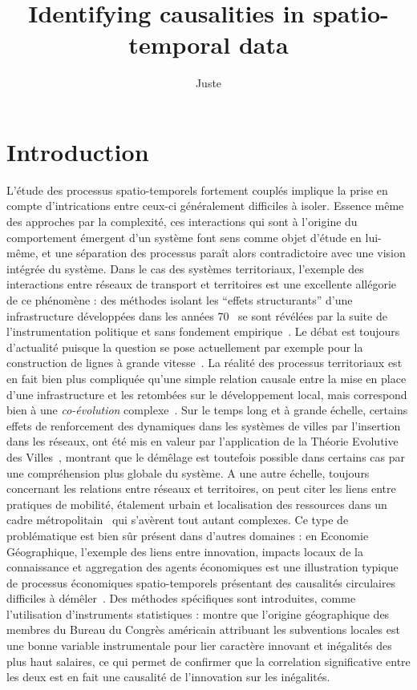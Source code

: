 \documentclass[english]{./sageo}
\title[Spatio-temporal Causalities]{Identifying causalities in spatio-temporal data}
\author[1,2]{Juste}{Raimbault}
\begin{document}
\maketitle

\newpage



\section{Introduction}



L'étude des processus spatio-temporels fortement couplés implique la prise en compte d'intrications entre ceux-ci généralement difficiles à isoler. Essence même des approches par la complexité, ces interactions qui sont à l'origine du comportement émergent d'un système font sens comme objet d'étude en lui-même, et une séparation des processus paraît alors contradictoire avec une vision intégrée du système. Dans le cas des systèmes territoriaux, l'exemple des interactions entre réseaux de transport et territoires est une excellente allégorie de ce phénomène : des méthodes isolant les ``effets structurants'' d'une infrastructure développées dans les années 70~\cite{bonnafous1974methodologies} se sont révélées par la suite de l'instrumentation politique et sans fondement empirique~\cite{offner1993effets}. Le débat est toujours d'actualité puisque la question se pose actuellement par exemple pour la construction de lignes à grande vitesse~\cite{crozethalshs01094554}. La réalité des processus territoriaux est en fait bien plus compliquée qu'une simple relation causale entre la mise en place d'une infrastructure et les retombées sur le développement local, mais correspond bien à une \emph{co-évolution} complexe~\cite{bretagnolletel00459720}. Sur le temps long et à grande échelle, certains effets de renforcement des dynamiques dans les systèmes de villes par l'insertion dans les réseaux, ont été mis en valeur par l'application de la Théorie Evolutive des Villes~\cite{espacegeo2014effets}, montrant que le démêlage est toutefois possible dans certains cas par une compréhension plus globale du système. A une autre échelle, toujours concernant les relations entre réseaux et territoires, on peut citer les liens entre pratiques de mobilité, étalement urbain et localisation des ressources dans un cadre métropolitain~\cite{cerqueira2017inegalites} qui s'avèrent tout autant complexes. Ce type de problématique est bien sûr présent dans d'autres domaines : en Economie Géographique, l'exemple des liens entre innovation, impacts locaux de la connaissance et aggregation des agents économiques est une illustration typique de processus économiques spatio-temporels présentant des causalités circulaires difficiles à démêler~\cite{audretsch1996r}. Des méthodes spécifiques sont introduites, comme l'utilisation d'instruments statistiques : \cite{aghion2015innovation} montre que l'origine géographique des membres du Bureau du Congrès américain attribuant les subventions locales est une bonne variable instrumentale pour lier caractère innovant et inégalités des plus haut salaires, ce qui permet de confirmer que la correlation significative entre les deux est en fait une causalité de l'innovation sur les inégalités.
\end{document}
